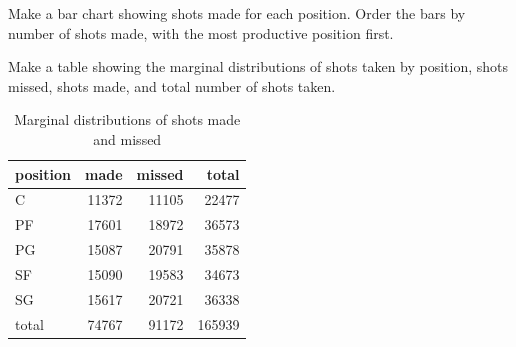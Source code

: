 \documentclass[letterpaper, landscape]{exam}
\begin{document}
\begin{questions}
      \question[5] Make a bar chart showing shots made for each position.  Order
        the bars by number of shots made, with the most productive position first.
        \label{q:sbp.first}

      \question[5] Make a table showing the marginal distributions of shots
      taken by position, shots missed, shots made, and total number of shots
      taken.

      \begin{solution}
        
        \begin{table}[H]
          \centering
          \begin{tabular}{lrrr}
            \toprule
            position & made  & missed & total \\
            \midrule
            C        & 11372 & 11105  & 22477 \\
            PF       & 17601 & 18972  & 36573 \\
            PG       & 15087 & 20791  & 35878 \\
            SF       & 15090 & 19583  & 34673 \\
            SG       & 15617 & 20721  & 36338 \\
            \midrule
            total    & 74767 & 91172  & 165939 \\
            \bottomrule
          \end{tabular}
          \caption{Marginal distributions of shots made and missed}
          \label{tab:marginal_shots}
        \end{table}

      \end{solution}

      \question 
        \label{q:sbp.last}
\end{questions}
\end{document}
